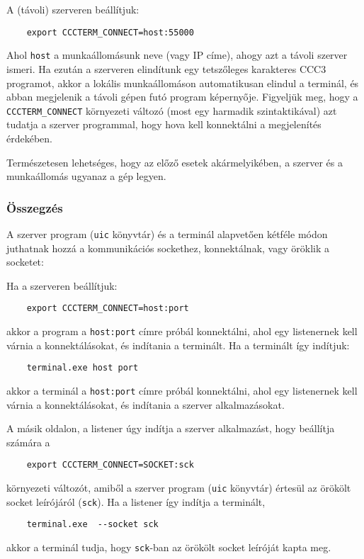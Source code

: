 A (távoli) szerveren beállítjuk:
\begin{verbatim}
    export CCCTERM_CONNECT=host:55000
\end{verbatim}
Ahol \verb!host! a munkaállomásunk neve (vagy IP címe), 
ahogy azt a távoli szerver ismeri. Ha ezután a szerveren
elindítunk egy tetszőleges karakteres CCC3 programot, akkor 
a lokális munkaállomáson automatikusan elindul a terminál,
és abban megjelenik a távoli gépen futó program képernyője.
Figyeljük meg, hogy a \verb!CCCTERM_CONNECT! környezeti
változó (most egy harmadik szintaktikával) azt tudatja 
a szerver programmal, hogy hova kell konnektálni a
megjelenítés érdekében.

Természetesen lehetséges, 
hogy az előző esetek akármelyikében,
a szerver és a munkaállomás ugyanaz a gép legyen.


\subsubsection{Összegzés}

A szerver program (\verb!uic! könyvtár) és a terminál 
alapvetően kétféle módon juthatnak hozzá a kommunikációs sockethez,
konnektálnak, vagy öröklik a socketet:

Ha a szerveren beállítjuk:
\begin{verbatim}
    export CCCTERM_CONNECT=host:port
\end{verbatim} akkor a program a \verb!host:port! címre próbál konnektálni,
ahol egy listenernek kell várnia a konnektálásokat, és indítania a terminált.
Ha a terminált így indítjuk:
\begin{verbatim}
    terminal.exe host port
\end{verbatim} akkor a terminál a \verb!host:port! címre próbál konnektálni,
ahol egy listenernek kell várnia a konnektálásokat, és indítania a 
szerver alkalmazásokat.

A másik oldalon, a listener úgy indítja a szerver alkalmazást,
hogy beállítja számára a 
\begin{verbatim}
    export CCCTERM_CONNECT=SOCKET:sck
\end{verbatim} környezeti változót, amiből a szerver program 
(\verb!uic! könyvtár)  értesül az örökölt socket leírójáról (\verb!sck!).
Ha a listener így indítja a terminált,
\begin{verbatim}
    terminal.exe  --socket sck
\end{verbatim} akkor a terminál tudja, hogy \verb!sck!-ban az örökölt 
socket leíróját kapta meg. 

